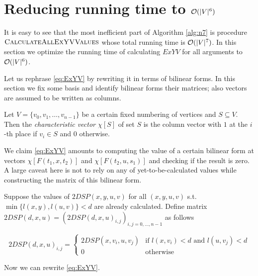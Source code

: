 \section{Reducing running time to $\mathcal{O}(|V|^6)$}

It is easy to see that the most inefficient part of Algorithm \ref{alg:n7} is procedure $\textsc{CalculateAllExYVValues}$ whose total running time is $\mathcal{O}(|V|^7)$. In this section we optimize the running time of calculating $ExYV$ for all arguments to $\mathcal{O}(|V|^6)$.

Let us rephrase \eqref{eq:ExYV} by rewriting it in terms of bilinear forms. In this section we fix some basis and identify bilinear forms their matrices; also vectors are assumed to be written as columns.

\begin{definition}
Let $V = \{v_0, v_1, \ldots, v_{n-1}\}$ be a certain fixed numbering of vertices and $S \subseteq V$. Then the \emph{characteristic vector $\chi[S]$} of set $S$ is the column vector with $1$ at the $i$-th place if $v_i \in S$ and $0$ otherwise.
\end{definition}

We claim \eqref{eq:ExYV} amounts to computing the value of a certain bilinear form at vectors $\chi[F(t_1, x, t_2)]$ and $\chi[F(t_2, u, s_1)]$ and checking if the result is zero. A large caveat here is not to rely on any of yet-to-be-calculated values while constructing the matrix of this bilinear form. 

\begin{definition}
Suppose the values of $2DSP(x, y, u, v)$ for all $(x, y, u, v)$ s.t. $\min\{l(x, y), l(u, v)\} < d$ are already calculated. Define matrix $2DSP(d,x,u) = (2DSP(d,x,u)_{i,j})_{i,j=0,\ldots,n-1}$ as follows

\begin{equation}
2DSP(d,x,u)_{i,j} = \begin{cases}
    2DSP(x,v_i,u,v_j) & \text{if } l(x,v_i) < d \text{ and } l(u,v_j) < d \\
    0                 & \text{otherwise}
\end{cases}
\end{equation}

\end{definition}

Now we can rewrite \eqref{eq:ExYV}.

